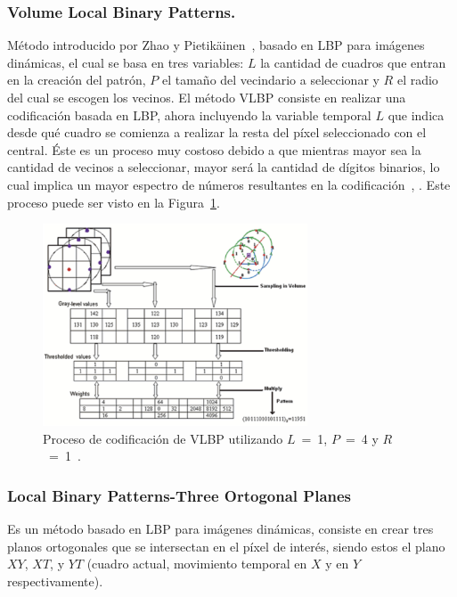 		\subsubsection{Volume Local Binary Patterns.}
		\label{sec:vlbp}
		Método introducido por Zhao y Pietikäinen~\cite{Zhao2006}, basado en LBP para imágenes dinámicas, el cual se basa en tres variables: $L$ la cantidad de cuadros que entran en la creación del patrón, $P$ el tamaño del vecindario a seleccionar y $R$ el radio del cual se escogen los vecinos. 
El método VLBP consiste en realizar una codificación basada en LBP, ahora incluyendo la variable temporal $L$ que indica desde qué cuadro se comienza a realizar la resta del píxel seleccionado con el central.
Éste es un proceso muy costoso debido a que mientras mayor sea la cantidad de vecinos a seleccionar, mayor será la cantidad de dígitos binarios, lo cual implica un mayor espectro de números resultantes en la codificación~\cite{Zhao2007a}, \cite{Zhao2007}. Este proceso puede ser visto en la Figura~\ref{art:fig:vlbp}.

\begin{figure}[tb]
  \centering
   \includegraphics[width=0.7\textwidth]{Figuras/vlbp.pdf}
  \caption{Proceso de codificación de VLBP utilizando $L$~=~1, $P$~=~4 y $R$~=~1~\cite{Zhao2007}.}
  \label{art:fig:vlbp}
\end{figure}


		\subsubsection{Local Binary Patterns-Three Ortogonal Planes}
		\label{sec:lbp-top}
		 Es un método basado en LBP para imágenes dinámicas, consiste en crear tres planos ortogonales que se intersectan en el píxel de interés, siendo estos el plano $XY$, $XT$, y $YT$ (cuadro actual, movimiento temporal en $X$ y en $Y$ respectivamente). 

